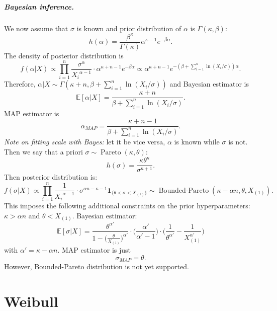 \documentclass[a4paper,11pt]{article}
\theoremstyle{plain}
\theoremstyle{definition}
\newcommand{\ME}{\mathbb{E}}
\begin{document}
	\subparagraph{Bayesian inference.} We now assume that $\sigma$ is known and prior distribution of $\alpha$ is $\Gamma(\kappa, \beta)$:
	\[
	h(\alpha) = \frac{\beta^\kappa}{\Gamma(\kappa)} \alpha^{\kappa-1}e^{-\beta \alpha}.
	\]
	The density of posterior distribution is
	\[
	f(\alpha | X) \propto \prod_{i=1}^n \frac{\sigma^\alpha}{{X_i}^{\alpha-1}} \cdot \alpha^{\kappa+n-1}e^{-\beta \alpha} \propto \alpha^{\kappa+n-1} e^{ -(\beta + \sum_{i=1}^n \ln (X_i/\sigma))\alpha }.
	\]
	Therefore, $\alpha |X \sim \Gamma(\kappa + n, \beta +\sum_{i=1}^n \ln (X_i/\sigma))$ and Bayesian estimator is
	\[ \ME[\alpha | X] = \frac{\kappa + n}{ \beta +\sum_{i=1}^n \ln (X_i/\sigma) }. \]
	MAP estimator is
	\[ \alpha_{MAP} = \frac{\kappa + n-1}{ \beta +\sum_{i=1}^n \ln (X_i/\sigma) }. \]
	\textit{Note on fitting scale with Bayes:} let it be vice versa, $\alpha$ is known while $\sigma$ is not. Then we say that a priori $\sigma \sim \operatorname{Pareto}(\kappa, \theta)$:
	\[
	h(\sigma) = \frac{\kappa\theta^\kappa}{\sigma^{\kappa+1}}.
	\]
	Then posterior distribution is:
	\[
	f(\sigma|X) \propto \prod_{i=1}^n \frac{1}{{X_i}^{\alpha-1}} \cdot \sigma^{\alpha n - \kappa - 1} \mathbf{1}_{ \{ \theta < \sigma < X_{(1)}\} } \sim \operatorname{Bounded-Pareto}(\kappa-\alpha n, \theta, X_{(1)}).
	\]
	This imposes the following additional constraints on the prior hyperparameters: $\kappa > \alpha n$ and $\theta < X_{(1)}$. Bayesian estimator:
	\[
	\ME[\sigma|X] = \frac{\theta^{\alpha'}}{1-\Big(\frac{\theta}{X_{(1)}}\Big)^{\alpha'}} \cdot \Big(\frac{\alpha'}{\alpha'-1}\Big)\cdot \bigg( \frac{1}{\theta^{\alpha'}} -\frac{1}{X_{(1)}^{\alpha'}} \bigg)
	\]
	with $\alpha'=\kappa - \alpha n$.
	MAP estimator is just
	\[
	\sigma_{MAP} = \theta.
	\]
	However, Bounded-Pareto distribution is not yet supported.
	
\section{Weibull}
\end{document}
